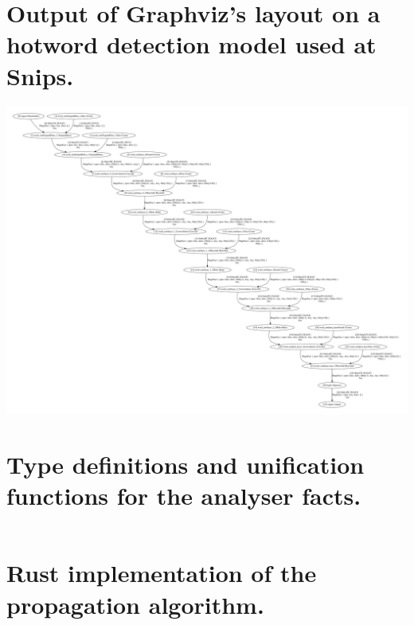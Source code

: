 \section{Output of Graphviz's layout on a hotword detection model used at Snips.}
\label{appendix-graphviz}
\begin{center}
\vspace{-0.5em}
\includegraphics[width=\textwidth]{hotword-classic-graphviz.pdf}
\vspace{-1em}
\end{center}

\newpage
\section{Type definitions and unification functions for the analyser facts.}
\label{appendix-analyser-types}
\inputminted{rust}{analyser-types.rs}

\bigskip
{}

\newpage
\section{Rust implementation of the propagation algorithm.}
\label{appendix-analyser-algorithm}
\inputminted{rust}{analyser-algorithm.rs}

\newpage
